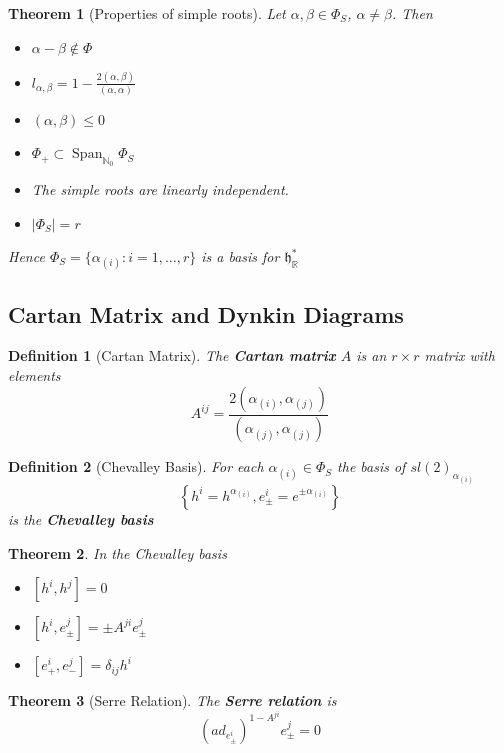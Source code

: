 \documentclass{article}
\newtheorem{theorem}{Theorem}[subsection]
\newtheorem{definition}{Definition}[subsection]
\DeclareMathOperator{\spn}{Span}
\newcommand{\bam}[1]{\textbf{#1}}
\newcommand{\mf}[1]{\mathfrak{#1}}
\newcommand{\mbb}[1]{\mathbb{#1}}
\newcommand{\comm}[2][]{\left[ #1, #2 \right]}
\begin{document}
\begin{theorem}[Properties of simple roots]
Let $\alpha,\beta\in\Phi_S$, $\alpha\neq\beta$. Then
\begin{itemize}
    \item $\alpha-\beta\notin\Phi$
    \item $l_{\alpha,\beta}=1-\frac{2(\alpha,\beta)}{(\alpha,\alpha)}$
    \item $(\alpha,\beta)\leq0$
    \item $\Phi_+\subset\spn_{\mbb{N}_0}\Phi_S$
    \item The simple roots are linearly independent.
    \item $|\Phi_S|=r$
\end{itemize}
Hence $\Phi_S=\lbrace \alpha_{(i)} : i=1,\dots,r \rbrace$ is a basis for $\mf{h}^\ast_\mbb{R}$
\end{theorem}

\subsection{Cartan Matrix and Dynkin Diagrams}

\begin{definition}[Cartan Matrix]
The \bam{Cartan matrix} $A$ is an $r \times r$ matrix with elements 
\[
A^{ij}=\frac{2(\alpha_{(i)},\alpha_{(j)})}{(\alpha_{(j)},\alpha_{(j)})}
\]
\end{definition}

\begin{definition}[Chevalley Basis]
For each $\alpha_{(i)}\in\Phi_S$ the basis of $sl(2)_{\alpha_{(i)}}$
\[
\left\{ h^i=h^{\alpha_{(i)}}, e^i_\pm=e^{\pm\alpha_{(i)}} \right\}
\]
is the \bam{Chevalley basis}
\end{definition}

\begin{theorem}
In the Chevalley basis
\begin{itemize}
    \item $\comm[h^i]{h^j}=0$
    \item $\comm[h^i]{e^j_\pm}=\pm A^{ji} e^j_\pm$
    \item $\comm[e^i_+]{e^j_-}=\delta_{ij} h^i$
\end{itemize}
\end{theorem}

\begin{theorem}[Serre Relation]
The \bam{Serre relation} is 
\[
\left( ad_{e^i_\pm}\right)^{1-A^{ji}} e^j_\pm=0
\]
\end{theorem}
\end{document}
